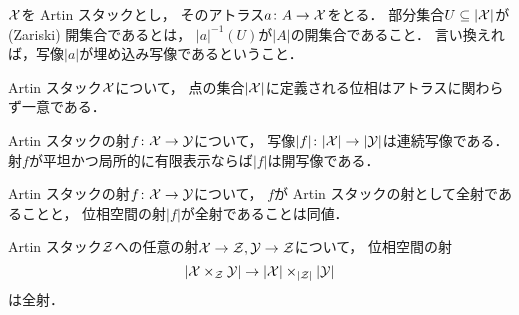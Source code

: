     \begin{Def}\label{def:topology_on_artst}
        $\mathcal{X}$を Artin スタックとし，
        そのアトラス$a \colon A \to \mathcal{X}$をとる．
        部分集合$U \subseteq |\mathcal{X}|$が (Zariski) 開集合であるとは，
        $|a|^{-1}(U)$が$|A|$の開集合であること．
        言い換えれば，写像$|a|$が埋め込み写像であるということ．
    \end{Def}

    \begin{Lemma}
        Artin スタック$\mathcal{X}$について，
        点の集合$|\mathcal{X}|$に定義される位相はアトラスに関わらず一意である．
    \end{Lemma}

    \begin{Lemma}
        Artin スタックの射$f \colon \mathcal{X} \to \mathcal{Y}$について，
        写像$|f| \colon |\mathcal{X}| \to |\mathcal{Y}|$は連続写像である．
        射$f$が平坦かつ局所的に有限表示ならば$|f|$は開写像である．
    \end{Lemma}

    \begin{Lemma}
    \begin{myenum}
    \item
        Artin スタックの射$f \colon \mathcal{X} \to \mathcal{Y}$について，
        $f$が Artin スタックの射として全射であることと，
        位相空間の射$|f|$が全射であることは同値．
    \item
        Artin スタック$\mathcal{Z}$への任意の射$\mathcal{X} \to \mathcal{Z}, \mathcal{Y} \to \mathcal{Z}$について，
        位相空間の射\[ |\mathcal{X} \times_{\mathcal{Z}} \mathcal{Y}| \to |\mathcal{X}| \times_{|\mathcal{Z}|} |\mathcal{Y}| \]は全射．
    \end{myenum}
    \end{Lemma}

